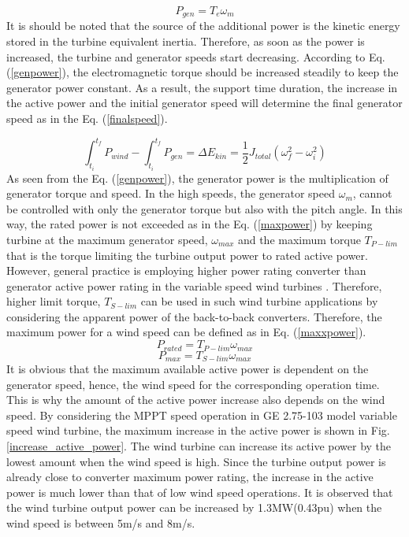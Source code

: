 \begin{equation}
P_{gen}=T_{e} \omega_{m}
\label{genpower}
\end{equation}
It is should be noted that the source of the additional power is the kinetic energy stored in the turbine equivalent inertia. Therefore, as soon as the power is increased, the turbine and generator speeds start decreasing. According to Eq. (\ref{genpower}), the electromagnetic torque should be increased steadily to keep the generator power constant. As a result, the support time duration, the increase in the active power and the initial generator speed will determine the final generator speed as in the Eq. (\ref{finalspeed}).\par
\begin{equation}
 \int_{t_{i}}^{t_{f}}P_{wind}- \int_{t_{i}}^{t_{f}}P_{gen}=\Delta E_{kin}=\frac{1}{2}J_{total}(\omega_{f}^2-\omega_{i}^2)
\label{finalspeed}
\end{equation}
As seen from the Eq. (\ref{genpower}), the generator power is the multiplication of generator torque and speed. In the high speeds, the generator speed $\omega_{m}$, cannot be controlled with only the generator torque but also with the pitch angle. In this way, the rated power is not exceeded as in the Eq. (\ref{maxpower}) by keeping turbine at the maximum generator speed, $\omega_{max}$ and the maximum torque $T_{P-lim}$ that is the torque limiting the turbine output power to rated active power. However, general practice is employing higher power rating converter than generator active power rating in the variable speed wind turbines \cite{Muljadi2012}.  Therefore, higher limit torque, $T_{S-lim}$ can be used in such wind turbine applications by considering the apparent power of the back-to-back converters. Therefore, the maximum power for a wind speed can be defined as in Eq. (\ref{maxxpower}).
\begin{equation}
P_{rated}=T_{P-lim} \omega_{max}
\label{maxpower}
\end{equation}
\begin{equation}
P_{max}=T_{S-lim} \omega_{max}
\label{maxxpower}
\end{equation}
It is obvious that the maximum available active power is dependent on the generator speed, hence, the wind speed for the corresponding operation time. This is why the amount of the active power increase also depends on the wind speed. By considering the MPPT speed operation in GE 2.75-103 model variable speed wind turbine, the maximum increase in the active power is shown in Fig. \ref{increase_active_power}. The wind turbine can increase its active power by the lowest amount when the wind speed is high. Since the turbine output power is already close to converter maximum power rating, the increase in the active power is much lower than that of low wind speed operations. It is observed that the wind turbine output power can be increased by 1.3MW(0.43pu) when the wind speed is between 5m/s and 8m/s. \par
